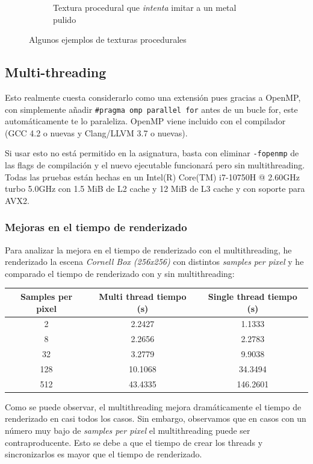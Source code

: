 \documentclass{article}
\begin{document}
\begin{figure}[H]
\begin{subfigure}[h]{0.4\linewidth}
    \caption{Textura procedural que \textit{intenta} imitar a un metal pulido}
  \end{subfigure}
  \caption{Algunos ejemplos de texturas procedurales}
\end{figure}

\subsection{Multi-threading}
Esto realmente cuesta considerarlo como una extensión pues gracias a OpenMP, con
simplemente añadir \texttt{\#pragma omp parallel for} antes de un bucle for,
este automáticamente te lo paraleliza. OpenMP viene incluido con el compilador
(GCC 4.2 o nuevas y Clang/LLVM 3.7 o nuevas).

Si usar esto no está permitido en la asignatura, basta con eliminar
\texttt{-fopenmp} de las flags de compilación y el nuevo ejecutable funcionará
pero sin multithreading. \\

Todas las pruebas están hechas en un Intel(R) Core(TM) i7-10750H @ 2.60GHz turbo
5.0GHz con 1.5 MiB de L2 cache y 12 MiB de L3 cache y con soporte para AVX2.

\subsubsection{Mejoras en el tiempo de renderizado}

Para analizar la mejora en el tiempo de renderizado con el multithreading, he
renderizado la escena \textit{Cornell Box (256x256)} con distintos \textit{samples per
  pixel} y he comparado el tiempo de renderizado con y sin multithreading:

\begin{center}
\begin{tabular}{||c c c||}
 \hline
 Samples per pixel & Multi thread tiempo (s) & Single thread tiempo (s) \\ [0.5ex]
 \hline\hline
 2 & 2.2427 & 1.1333 \\
 \hline
 8 & 2.2656 & 2.2783 \\
 \hline
 32 & 3.2779 & 9.9038 \\
 \hline
 128 & 10.1068 & 34.3494 \\
 \hline
 512 & 43.4335 & 146.2601 \\ [1ex]
 \hline
\end{tabular}
\end{center}

Como se puede observar, el multithreading mejora dramáticamente el tiempo de
renderizado en casi todos los casos. Sin embargo, observamos que en casos con un
número muy bajo de \textit{samples per pixel} el multithreading puede ser
contraproducente. Esto se debe a que el tiempo de crear los threads y
sincronizarlos es mayor que el tiempo de renderizado.
\end{document}
